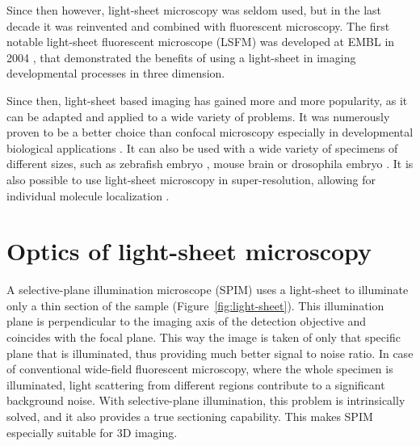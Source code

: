 \documentclass{diploma_style}
\begin{document}
Since then however, light-sheet microscopy was seldom used, but in the last decade it was reinvented and combined with fluorescent microscopy. The first notable light-sheet fluorescent microscope (LSFM) was developed at EMBL in 2004 \cite{huisken_optical_2004}, that demonstrated the benefits of using a light-sheet in imaging developmental processes in three dimension.

Since then, light-sheet based imaging has gained more and more popularity, as it can be adapted and applied to a wide variety of problems. It was numerously proven to be a better choice than confocal microscopy \cite{reynaud_light_2008,huisken_selective_2009} especially in developmental biological applications \cite{weber_light_2011}. It can also be used with a wide variety of specimens of different sizes, such as zebrafish embryo \cite{keller_reconstruction_2008}, mouse brain \cite{dodt_ultramicroscopy:_2007} or drosophila embryo \cite{krzic_multiview_2012}. It is also possible to use light-sheet microscopy in super-resolution, allowing for individual molecule localization \cite{cella_zanacchi_live-cell_2011}.


\section{Optics of light-sheet microscopy}

A selective-plane illumination microscope (SPIM) uses a light-sheet to illuminate only a thin section of the sample (Figure~\ref{fig:light-sheet}). This illumination plane is perpendicular to the imaging axis of the detection objective and coincides with the focal plane. This way the image is taken of only that specific plane that is illuminated, thus providing much better signal to noise ratio. In case of conventional wide-field fluorescent microscopy, where the whole specimen is illuminated, light scattering from different regions contribute to a significant background noise. With selective-plane illumination, this problem is intrinsically solved, and it also provides a true sectioning capability. This makes SPIM especially suitable for 3D imaging.
\end{document}
